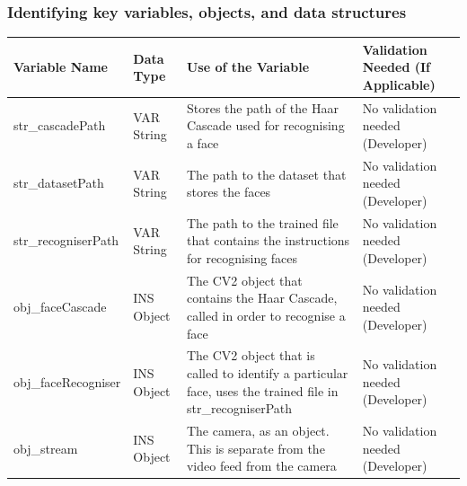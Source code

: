 \documentclass[9pt]{article}
\begin{document}
\subsubsection{Identifying key variables, objects, and data structures}
\begin{table}[H]
	\centering
	\begin{tabularx}{\textwidth}{llXX}
		\textbf{Variable Name} & \textbf{Data Type} & \textbf{Use of the Variable}                                                                                                                      & \textbf{Validation Needed (If Applicable)}                                                                           \\ \midrule
		str\_cascadePath       & VAR String         & Stores the path of the Haar Cascade used for recognising a face                                                                                   & No validation needed (Developer)                                                                                     \\
		str\_datasetPath       & VAR String         & The path to the dataset that stores the faces                                                                                                     & No validation needed (Developer)                                                                                     \\
		str\_recogniserPath    & VAR String         & The path to the trained file that contains the instructions for recognising faces                                                                 & No validation needed (Developer)                                                                                     \\
		obj\_faceCascade       & INS Object         & The CV2 object that contains the Haar Cascade, called in order to recognise a face                                                                & No validation needed (Developer)                                                                                     \\
		obj\_faceRecogniser    & INS Object         & The CV2 object that is called to identify a particular face, uses the trained file in str\_recogniserPath                                         & No validation needed (Developer)                                                                                     \\
		obj\_stream            & INS Object         & The camera, as an object. This is separate from the video feed from the camera                                                                    & No validation needed (Developer)                                                                                     \\

\end{tabularx}
\end{table}
\end{document}
